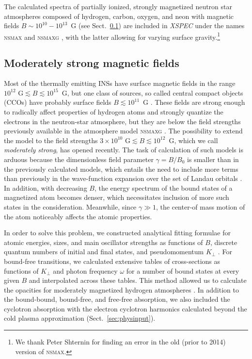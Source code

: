 \documentclass{pos1}
\newcommand{\Kp}{K_\perp}
\begin{document}
The calculated spectra of partially ionized, strongly magnetized
neutron star atmospheres composed of hydrogen, carbon, oxygen, and
neon with magnetic fields $B\sim10^{10}-10^{13}$~G
(see Sect.~\ref{sec:moderate}) are included
in \textit{XSPEC} \cite{XSPEC} under the names \textsc{nsmax}
\cite{MoriHo,HoPC} and \textsc{nsmaxg} \cite{MoriHo,Ho14,PCH14},
with the latter allowing for varying surface gravity.\footnote{We thank Peter
Shternin for finding an error in the old (prior to 2014) version of
\textsc{nsmax}.}

\subsection{Moderately strong magnetic fields}
\label{sec:moderate}

Most of the thermally emitting INSs have surface magnetic fields in
the range $10^{12}\mbox{ G}\lesssim B \lesssim 10^{15}$~G, but one
class of sources, so called central compact objects (CCOs) have
probably surface fields $B\lesssim10^{11}$~G
\cite{HalpernGotthelf10,GotthelfHA13,Ho13}.
These fields are strong enough to radically affect properties of
hydrogen atoms and strongly quantize the electrons in the neutron-star
atmosphere, but they are below the field strengths previously
available in the atmosphere model \textsc{nsmaxg} \cite{Ho14}. The
possibility to extend the model to the field strengths
$3\times10^{10}\mbox{ G}\lesssim B\lesssim 10^{12}$~G, which we call
\emph{moderately strong}, has opened recently. The task of calculation
of such models is arduous because the dimensionless field parameter
$\gamma=B/B_0$ is smaller than in the previously calculated models,
which entails the need to include more terms than previously in the
wave-function expansion over the set of Landau orbitals \cite{P94}. In
addition, with decreasing $B$, the energy spectrum of the bound states
of a magnetized atom becomes denser, which necessitates inclusion of
more such states in the consideration. Meanwhile, since $\gamma\gg1$,
the center-of mass motion of the atom noticeably affects the atomic
properties. 

In order to solve this problem, we constructed analytical fitting
formulae for atomic energies, sizes, and main oscillator strengths as
functions of $B$, discrete quantum numbers of initial and final
states, and  pseudomomentum $\Kp$ \cite{PCH14}. For bound-free
transitions, we calculated extensive tables of cross-sections as
functions of $\Kp$ and photon frequency $\omega$ for a number of bound
states at every given $B$ and interpolated across these tables. This
method allowed us to calculate the opacities for moderately magnetized
hydrogen atmospheres \cite{PCH14}. In addition to the bound-bound,
bound-free, and free-free absorption, we also included the
cyclotron absorption with the electron cyclotron harmonics calculated
beyond the cold plasma approximation (Sect.~\ref{sec:physinput}).
\end{document}
